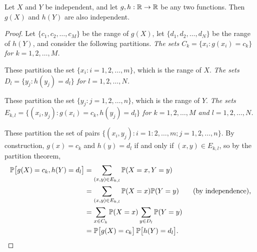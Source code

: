 \begin{theorem}
Let $X$ and $Y$ be independent, and let $g,h:\mathbb{R}\to\mathbb{R}$ be any two functions. Then $g(X)$ and $h(Y)$ are also independent.
\end{theorem}
\begin{proof}

Let $\{c_1,c_2,\ldots,c_M\}$ be the range of $g(X)$, let $\{d_1,d_2,\ldots,d_N\}$ be the range of $h(Y)$, and consider the following partitions.
\bit
\it The sets $C_k=\{x_i:g(x_i)=c_k\}$ for $k=1,2,\ldots,M$. 
\par These partition the set $\{x_i:i=1,2,\ldots,m\}$, which is the range of $X$.
\it The sets $D_l=\{y_j:h(y_j)=d_l\}$ for $l=1,2,\ldots,N$. 
\par These partition the set $\{y_j:j=1,2,\ldots,n\}$, which is the range of $Y$.
\it The sets $E_{k,l} = \{(x_i,y_j):g(x_i)=c_k,h(y_j)=d_l\}$ for $k=1,2,\ldots,M$ and $l=1,2,\ldots,N$.
\par These partition the set of pairs $\{(x_i,y_j):i=1:2,\ldots,m ; j=1,2,\ldots,n\}$.
\eit
By construction, $g(x)=c_k$ and $h(y)=d_l$ if and only if $(x,y)\in E_{k,l}$, so by the partition theorem,
\begin{align*}
\mathbb{P}\big[g(X)=c_k,h(Y)=d_l\big]
	& = \sum_{(x,y)\in E_{k,l}}\mathbb{P}(X=x,Y=y) \\
	& = \sum_{(x,y)\in E_{k,l}}\mathbb{P}(X=x)\mathbb{P}(Y=y)\qquad\text{(by independence),}\\
	& = \sum_{x\in C_k}\mathbb{P}(X=x) \sum_{y\in D_l}\mathbb{P}(Y=y) \\
	& = \mathbb{P}\big[g(X)=c_k\big]\,\mathbb{P}\big[h(Y)=d_l\big].
\end{align*}


\end{proof}
